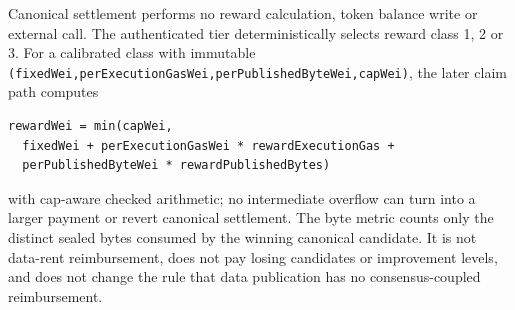 \documentclass[a4paper,11pt]{article}
\newcommand{\code}[1]{\nolinkurl{#1}}
\begin{document}
Canonical settlement performs no reward calculation, token balance write or
external call.  The authenticated tier deterministically selects reward class
1, 2 or 3.  For a calibrated class with immutable
\code{(fixedWei,perExecutionGasWei,perPublishedByteWei,capWei)}, the later
claim path computes
\begin{verbatim}
rewardWei = min(capWei,
  fixedWei + perExecutionGasWei * rewardExecutionGas +
  perPublishedByteWei * rewardPublishedBytes)
\end{verbatim}
with cap-aware checked arithmetic; no intermediate overflow can turn into a
larger payment or revert canonical settlement.  The byte metric counts only the
distinct sealed bytes consumed by the winning canonical candidate.  It is not
data-rent reimbursement, does not pay losing candidates or improvement levels,
and does not change the rule that data publication has no consensus-coupled
reimbursement.
\end{document}
